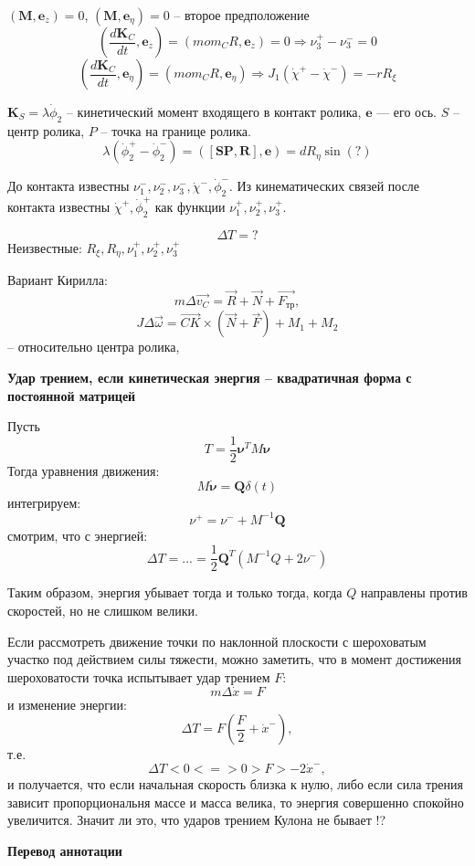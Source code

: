 \documentclass{article}
\newcommand{\bs}[1]{\boldsymbol{#1}}
\begin{document}
$(\bs{M},\bs{e}_z) = 0$, $(\bs{M},\bs{e}_\eta) = 0$ -- второе предположение
\begin{equation}
(\frac{d\bs{K}_C}{dt},\bs{e}_z) = (mom_C R,\bs{e}_z) = 0\Longrightarrow \nu_3^+ - \nu_3^- = 0
\end{equation}
\begin{equation}
(\frac{d\bs{K}_C}{dt},\bs{e}_\eta) = (mom_C R,\bs{e}_\eta) \Longrightarrow J_1(\dot{\chi}^+ - \dot{\chi}^-) = -r R_\xi
\end{equation}

$\bs{K}_S=\lambda\dot{\phi}_2$ -- кинетический момент входящего в контакт ролика, $\bs{e}$ --- его ось. $S$ -- центр ролика, $P$ -- точка на границе ролика.
\begin{equation}
\lambda(\dot{\phi}_2^+-\dot{\phi}_2^-) = ([\bs{SP},\bs{R}],\bs{e}) = dR_\eta\sin(?)
\end{equation}

До контакта известны $\nu_1^-, \nu_2^-, \nu_3^-, \dot\chi^-, \dot\phi_2^-$. 
Из кинематических связей после контакта известны $\dot{\chi}^+, \dot{\phi}_2^{+}$ как функции $\nu_1^{+}, \nu_2^{+}, \nu_3^{+}$.

$$
\Delta T = ? 
$$
Неизвестные: $R_\xi, R_\eta, \nu_1^{+}, \nu_2^{+}, \nu_3^{+}$





Вариант Кирилла:
$$
m \Delta \vec{v_C} = \vec{R} + \vec{N} + \vec{F_{тр}},
$$
$$
J \Delta \vec{\omega} = \vec{CK} \times( \vec{N} + \vec{F} ) + M_1 + M_2
$$
 -- относительно центра ролика,
 
\newpage

\textbf{Удар трением, если кинетическая энергия -- квадратичная форма с постоянной матрицей}

Пусть
$$ T = \frac{1}{2}\mathbf{\nu}^T M \mathbf{\nu} $$
Тогда уравнения движения:
$$ M\dot{\mathbf{\nu}} = \mathbf{Q}\delta(t) $$
интегрируем:
$$ \nu^+ = \nu^- + M^{-1}\mathbf{Q} $$
смотрим, что с энергией:
$$ \Delta T = ... = \frac{1}{2}\mathbf{Q}^T \left( M^{-1}Q + 2\nu^{-} \right) $$

Таким образом, энергия убывает тогда и только тогда, когда $Q$ направлены против скоростей, но не слишком велики.

Если рассмотреть движение точки по наклонной плоскости с шероховатым участко под действием силы тяжести, можно заметить, что в момент достижения шероховатости точка испытывает удар трением $F$:
$$ m\Delta\dot{x} = F $$
и изменение энергии:
$$ \Delta T = F(\frac{F}{2} + \dot{x}^-), $$
т.е.
$$ \Delta T < 0 <=> 0 > F > -2\dot{x}^-, $$
и получается, что если начальная скорость близка к нулю, либо если сила трения зависит пропорциональня массе и масса велика, то энергия совершенно спокойно увеличится. Значит ли это, что ударов трением Кулона не бывает !?

\newpage

\textbf{Перевод аннотации}


  
\end{document}
